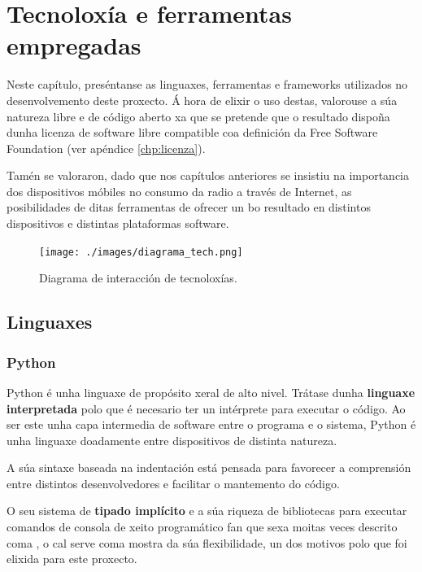 \chapter[Tecnoloxía e ferramentas empregadas]{
  \label{chp:tecnologia}
  Tecnoloxía e ferramentas empregadas
}
\minitoc
\newpage

Neste capítulo, preséntanse as linguaxes, ferramentas e frameworks utilizados no desenvolvemento deste proxecto. Á hora de elixir o uso destas, valorouse a súa natureza libre e de código aberto xa que se pretende que o resultado dispoña dunha licenza de software libre compatible coa definición da Free Software Foundation\cite{licenza} (ver apéndice \ref{chp:licenza}). 

Tamén se valoraron, dado que nos capítulos anteriores se insistiu na importancia dos dispositivos móbiles no consumo da radio a través de Internet, as posibilidades de ditas ferramentas de ofrecer un bo resultado en distintos dispositivos e distintas plataformas software. 


\begin{figure}[H]
	\centering
	\texttt{[image: ./images/diagrama\_tech.png]}
	\caption{Diagrama de interacción de tecnoloxías.}
	\label{fig:img_diagrama_tech}
\end{figure}


\section{Linguaxes}

\subsection{Python}
\label{python}
Python é unha linguaxe de propósito xeral de alto nivel. Trátase dunha \textbf{linguaxe interpretada} polo que é necesario 
ter un intérprete para executar o código. Ao ser este unha capa intermedia de software entre o programa
e o sistema, Python é unha linguaxe doadamente  entre dispositivos de distinta natureza.

A súa sintaxe baseada na indentación está pensada para favorecer a comprensión entre distintos desenvolvedores e 
facilitar o mantemento do código. 

O seu sistema de \textbf{tipado implícito} e a súa riqueza de bibliotecas para executar comandos de consola de xeito programático
fan que sexa moitas veces descrito coma \cite{python1}, o cal serve coma 
mostra da súa flexibilidade, un dos motivos polo que foi elixida para este proxecto.

